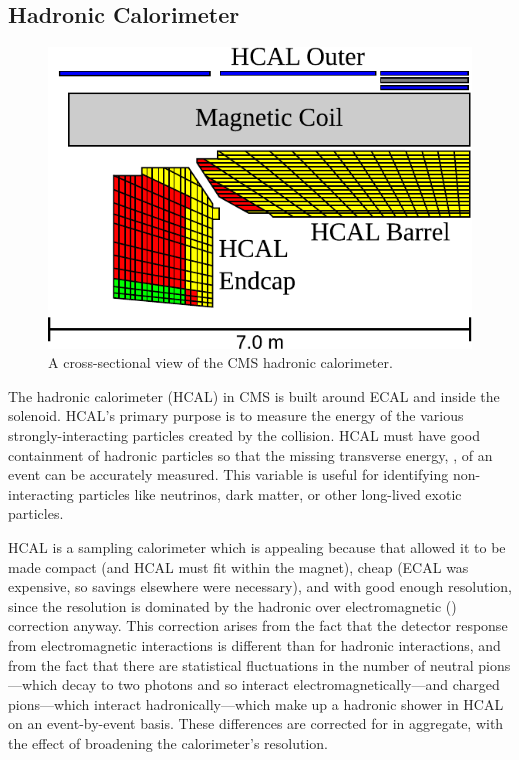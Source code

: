 \subsection{Hadronic Calorimeter}

\begin{figure}[tb]
    \centering
    \includegraphics[width=\textwidth]{figures/hcal_cross_section.pdf}
    \caption{A cross-sectional view of the CMS hadronic calorimeter.}
    \label{fig:hcal_layout}
\end{figure}

The hadronic calorimeter (HCAL) in CMS is built around ECAL and inside the
solenoid. HCAL's primary purpose is to measure the energy of the various
strongly-interacting particles created by the collision. HCAL must have good
containment of hadronic particles so that the missing transverse energy, \MET,
of an event can be accurately measured. This variable is useful for identifying
non-interacting particles like neutrinos, dark matter, or other long-lived
exotic particles.

HCAL is a sampling calorimeter which is appealing because that allowed it to be
made compact (and HCAL must fit within the magnet), cheap (ECAL was expensive,
so savings elsewhere were necessary), and with good enough resolution, since
the resolution is dominated by the hadronic over electromagnetic (\HOverE)
correction anyway. This correction arises from the fact that the detector
response from electromagnetic interactions is different than for hadronic
interactions, and from the fact that there are statistical fluctuations in the
number of neutral pions---which decay to two photons and so interact
electromagnetically---and charged pions---which interact hadronically---which
make up a hadronic shower in HCAL on an event-by-event basis. These differences
are corrected for in aggregate, with the effect of broadening the calorimeter's
resolution.

